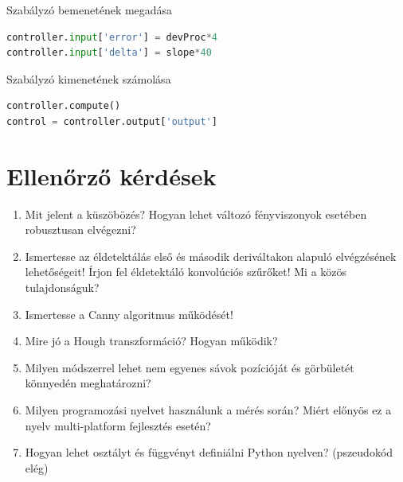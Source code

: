 \documentclass[12pt,a4paper,oneside]{report}             %
\begin{document}
Szabályzó bemenetének megadása

\begin{lstlisting}[language=Python]
controller.input['error'] = devProc*4
controller.input['delta'] = slope*40
\end{lstlisting}

Szabályzó kimenetének számolása

\begin{lstlisting}[language=Python]
controller.compute()
control = controller.output['output']
\end{lstlisting}

\chapter{Ellenőrző kérdések}

\begin{enumerate}
\item Mit jelent a küszöbözés? Hogyan lehet változó fényviszonyok esetében robusztusan elvégezni?
\item Ismertesse az éldetektálás első és második deriváltakon alapuló elvégzésének lehetőségeit! Írjon fel éldetektáló konvolúciós szűrőket! Mi a közös tulajdonságuk?
\item Ismertesse a Canny algoritmus működését!
\item Mire jó a Hough transzformáció? Hogyan működik?
\item Milyen módszerrel lehet nem egyenes sávok pozícióját és görbületét könnyedén meghatározni?
\item Milyen programozási nyelvet használunk a mérés során? Miért előnyös ez a nyelv multi-platform fejlesztés esetén?
\item Hogyan lehet osztályt és függvényt definiálni Python nyelven? (pszeudokód elég)
\end{enumerate}

\printbibliography
\end{document}

